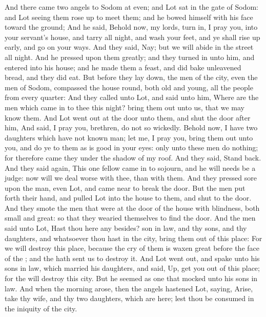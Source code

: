 \begin{biblechapter} %
 And there came two angels to Sodom at even; and Lot sat in the gate of Sodom: and Lot seeing them rose up to meet them; and he bowed himself with his face toward the ground;
\verse And he said, Behold now, my lords, turn in, I pray you, into your servant's house, and tarry all night, and wash your feet, and ye shall rise up early, and go on your ways. And they said, Nay; but we will abide in the street all night.
\verse And he pressed upon them greatly; and they turned in unto him, and entered into his house; and he made them a feast, and did bake unleavened bread, and they did eat.
\verse But before they lay down, the men of the city, even the men of Sodom, compassed the house round, both old and young, all the people from every quarter:
\verse And they called unto Lot, and said unto him, Where are the men which came in to thee this night? bring them out unto us, that we may know them.
\verse And Lot went out at the door unto them, and shut the door after him,
\verse And said, I pray you, brethren, do not so wickedly.
\verse Behold now, I have two daughters which have not known man; let me, I pray you, bring them out unto you, and do ye to them as is good in your eyes: only unto these men do nothing; for therefore came they under the shadow of my roof.
\verse And they said, Stand back. And they said again, This one fellow came in to sojourn, and he will needs be a judge: now will we deal worse with thee, than with them. And they pressed sore upon the man, even Lot, and came near to break the door.
\verse But the men put forth their hand, and pulled Lot into the house to them, and shut to the door.
\verse And they smote the men that were at the door of the house with blindness, both small and great: so that they wearied themselves to find the door.
\verse And the men said unto Lot, Hast thou here any besides? son in law, and thy sons, and thy daughters, and whatsoever thou hast in the city, bring them out of this place:
\verse For we will destroy this place, because the cry of them is waxen great before the face of the \LORD; and the \LORD hath sent us to destroy it.
\verse And Lot went out, and spake unto his sons in law, which married his daughters, and said, Up, get you out of this place; for the \LORD will destroy this city. But he seemed as one that mocked unto his sons in law.
\verse And when the morning arose, then the angels hastened Lot, saying, Arise, take thy wife, and thy two daughters, which are here; lest thou be consumed in the iniquity of the city.

\end{biblechapter}

